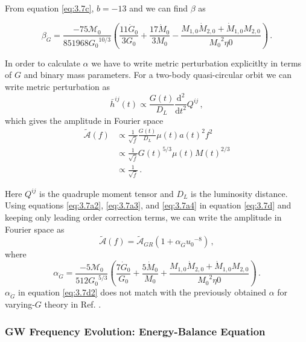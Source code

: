 \documentclass[11pt]{article}
\begin{document}
\hspace*{15.5pt}From equation \eqref{eq:3.7c}, $b=-13$  and we can find $\beta$ as

 \begin{equation}
 \beta_{\dot{G}}=\frac{-75 \mathcal{M}_0}{851968 {G_0}^{10/3}} \left(\frac{11 \dot{G}_0}{3 G_0} + \frac{17 \dot{M}_0}{3M_0}-\frac{M_{1,0}\dot{M}_{2,0}+\dot{M}_{1,0}M_{2,0}}{{M_0}^2 \eta0}\right)\,.
  \end{equation}
 
 \hspace*{15.5pt}In order to calculate $\alpha$ we have to write metric perturbation explicitlty in terms of $G$ and binary mass parameters. For a two-body quasi-circular orbit we can write metric perturbation as \cite{Blanchet:2002av}
 \begin{equation}
\bar{h}^{ij}(t)\propto \frac{G(t)}{D_L}\frac{\mathrm{d^2} }{\mathrm{d} t^2}Q^{ij}\,,
 \end{equation}
which gives the amplitude in Fourier space
\begin{align}\label{eq:3.7d}
\tilde{\mathcal{A}}(f)&\propto\frac{1}{\sqrt{\dot{f}}}\frac{G(t)}{D_L}\mu(t) a(t)^2f^2\nonumber\\&\propto\frac{1}{\sqrt{\dot{f}}}{G(t)}^{5/3}\mu(t){M(t)}^{2/3}\nonumber\\ &\propto \frac{1}{\sqrt{\dot{f}}}  \,.
\end{align} 
 

Here $Q^{ij}$ is the quadruple moment tensor and $D_L$ is the luminosity distance. Using equations \eqref{eq:3.7a2}, \eqref{eq:3.7a3}, and \eqref{eq:3.7a4} in equation \eqref{eq:3.7d} and keeping only leading order correction terms, we can write the amplitude in Fourier space as
\begin{equation}
\tilde{\mathcal{A}}(f)=\tilde{\mathcal{A}}_{GR}\left(1+\alpha_{\dot{G}}{u_0}^{-8}\right)\,,
\end{equation}
where
\begin{equation}\label{eq:3.7d2}
 \alpha_{\dot{G}}=\frac{-5\mathcal{M}_0}{512 {G_0}^{5/3}} \left(\frac{7 \dot{G}_0}{ G_0} + \frac{5\dot{M}_0}{M_0}+\frac{M_{1,0}\dot{M}_{2,0}+\dot{M}_{1,0}M_{2,0}}{{M_0}^2 \eta0}\right)\,.
 \end{equation}
 \hspace{15.5pt} $\alpha_{\dot{G}}$ in equation \eqref{eq:3.7d2} does not match with the previously obtained $\alpha$ for varying-$G$ theory in Ref. \cite{Yunes:2009bv}.
 
 \subsubsection*{GW Frequency Evolution: Energy-Balance Equation}
 
\end{document}
